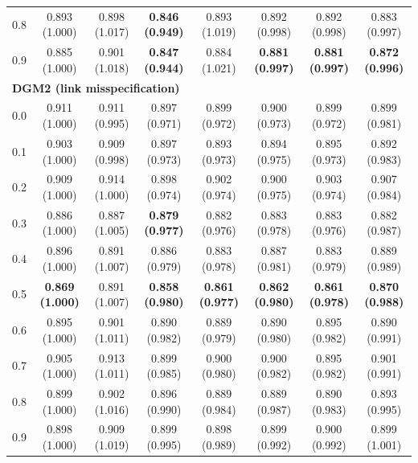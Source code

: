 \begin{table}[!h]
{\begin{tabular}[t]{|c|ccccccc|}
\hspace{1em}0.8 & 0.893 (1.000) & 0.898 (1.017) & \textbf{0.846 (0.949)} & 0.893 (1.019) & 0.892 (0.998) & 0.892 (0.998) & 0.883 (0.997)\\
\hspace{1em}0.9 & 0.885 (1.000) & 0.901 (1.018) & \textbf{0.847 (0.944)} & 0.884 (1.021) & \textbf{0.881 (0.997)} & \textbf{0.881 (0.997)} & \textbf{0.872 (0.996)}\\
\hline
\multicolumn{8}{|l|}{\textbf{DGM2 (link misspecification)}}\\
\hspace{1em}0.0 & 0.911 (1.000) & 0.911 (0.995) & 0.897 (0.971) & 0.899 (0.972) & 0.900 (0.973) & 0.899 (0.972) & 0.899 (0.981)\\
\hspace{1em}0.1 & 0.903 (1.000) & 0.909 (0.998) & 0.897 (0.973) & 0.893 (0.973) & 0.894 (0.975) & 0.895 (0.973) & 0.892 (0.983)\\
\hspace{1em}0.2 & 0.909 (1.000) & 0.914 (1.000) & 0.898 (0.974) & 0.902 (0.974) & 0.900 (0.975) & 0.903 (0.974) & 0.907 (0.984)\\
\hspace{1em}0.3 & 0.886 (1.000) & 0.887 (1.005) & \textbf{0.879 (0.977)} & 0.882 (0.976) & 0.883 (0.978) & 0.883 (0.976) & 0.882 (0.987)\\
\hspace{1em}0.4 & 0.896 (1.000) & 0.891 (1.007) & 0.886 (0.979) & 0.883 (0.978) & 0.887 (0.981) & 0.883 (0.979) & 0.889 (0.989)\\
\hspace{1em}0.5 & \textbf{0.869 (1.000)} & 0.891 (1.007) & \textbf{0.858 (0.980)} & \textbf{0.861 (0.977)} & \textbf{0.862 (0.980)} & \textbf{0.861 (0.978)} & \textbf{0.870 (0.988)}\\
\hspace{1em}0.6 & 0.895 (1.000) & 0.901 (1.011) & 0.890 (0.982) & 0.889 (0.979) & 0.890 (0.980) & 0.895 (0.982) & 0.890 (0.991)\\
\hspace{1em}0.7 & 0.905 (1.000) & 0.913 (1.011) & 0.899 (0.985) & 0.900 (0.980) & 0.900 (0.982) & 0.895 (0.982) & 0.901 (0.991)\\
\hspace{1em}0.8 & 0.899 (1.000) & 0.902 (1.016) & 0.896 (0.990) & 0.889 (0.984) & 0.889 (0.987) & 0.890 (0.983) & 0.893 (0.995)\\
\hspace{1em}0.9 & 0.898 (1.000) & 0.909 (1.019) & 0.899 (0.995) & 0.898 (0.989) & 0.899 (0.992) & 0.900 (0.992) & 0.899 (1.001)\\

\end{tabular}}
\end{table}
